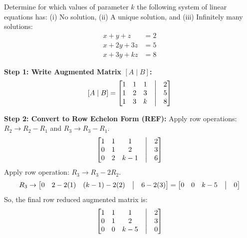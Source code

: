 \documentclass[11pt,a4paper]{article}
\begin{document}
\vspace{0.8cm}

\begin{questionbox}
Determine for which values of parameter $k$ the following system of linear equations has: (i) No solution, (ii) A unique solution, and (iii) Infinitely many solutions:
\begin{align*}
x + y + z &= 2 \\
x + 2y + 3z &= 5 \\
x + 3y + kz &= 8
\end{align*}
\end{questionbox}

\begin{solutionbox}
\textbf{Step 1: Write Augmented Matrix $[A \mid B]$:}
\[ [A \mid B] = \begin{bmatrix} 1 & 1 & 1 & \bigm| & 2 \\ 1 & 2 & 3 & \bigm| & 5 \\ 1 & 3 & k & \bigm| & 8 \end{bmatrix} \]

\textbf{Step 2: Convert to Row Echelon Form (REF):}
Apply row operations: $R_2 \to R_2 - R_1$ and $R_3 \to R_3 - R_1$.
\[ \begin{bmatrix} 1 & 1 & 1 & \bigm| & 2 \\ 0 & 1 & 2 & \bigm| & 3 \\ 0 & 2 & k-1 & \bigm| & 6 \end{bmatrix} \]
Apply row operation: $R_3 \to R_3 - 2R_2$.
\[ R_3 \to \begin{bmatrix} 0 & 2-2(1) & (k-1)-2(2) & \bigm| & 6-2(3) \end{bmatrix} = \begin{bmatrix} 0 & 0 & k-5 & \bigm| & 0 \end{bmatrix} \]
So, the final row reduced augmented matrix is:
\[ \begin{bmatrix} 1 & 1 & 1 & \bigm| & 2 \\ 0 & 1 & 2 & \bigm| & 3 \\ 0 & 0 & k-5 & \bigm| & 0 \end{bmatrix} \]


\end{solutionbox}
\end{document}
